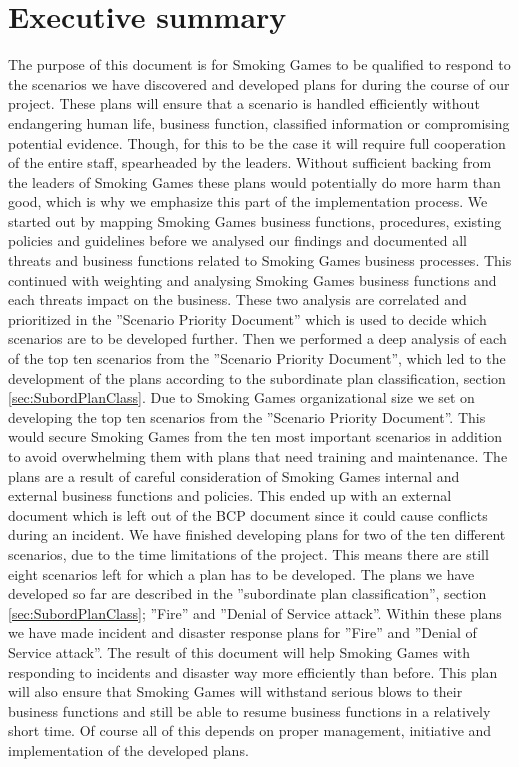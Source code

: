 \chapter{Executive summary}

The purpose of this document is for Smoking Games to be qualified to respond to the scenarios we have discovered and developed plans for during the course of our project. These plans will ensure that a scenario is handled efficiently without endangering human life, business function, classified information or compromising potential evidence. Though, for this to be the case it will require full cooperation of the entire staff, spearheaded by the leaders. Without sufficient backing from the leaders of Smoking Games these plans would potentially do more harm than good, which is why we emphasize this part of the implementation process.
We started out by mapping Smoking Games business functions, procedures, existing policies and guidelines before we analysed our findings and documented all threats and business functions related to Smoking Games business processes. This continued with weighting and analysing Smoking Games business functions and each threats impact on the business. These two analysis are correlated and prioritized in the ”Scenario Priority Document” which is used to decide which scenarios are to be developed further.
Then we performed a deep analysis of each of the top ten scenarios from the ”Scenario Priority Document”, which led to the development of the plans according to the subordinate plan classification, section \ref{sec:SubordPlanClass}.
Due to Smoking Games organizational size we set on developing the top ten scenarios from the ”Scenario Priority Document”. This would secure Smoking Games from the ten most important scenarios in addition to avoid overwhelming them with plans that need training and maintenance.
The plans are a result of careful consideration of Smoking Games internal and external business functions and policies. This ended up with an external document which is left out of the BCP document since it could cause conflicts during an incident.
We have finished developing plans for two of the ten different scenarios, due to the time limitations of the project. This means there are still eight scenarios left for which a plan has to be developed.
The plans we have developed so far are described in the ”subordinate plan classification”, section \ref{sec:SubordPlanClass}; ”Fire” and ”Denial of Service attack”. Within these plans we have made incident and disaster response plans for ”Fire” and ”Denial of Service attack”.
The result of this document will help Smoking Games with responding to incidents and disaster way more efficiently than before. This plan will also ensure that Smoking Games will withstand serious blows to their business functions and still be able to resume business functions in a relatively short time. 
Of course all of this depends on proper management, initiative and implementation of the developed plans.